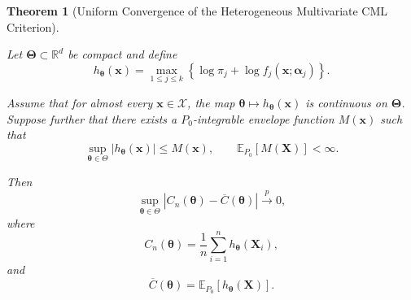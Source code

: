 \documentclass[pdflatex,sn-mathphys-ay]{sn-jnl}%
\let\oldtheta\theta
\renewcommand{\theta}{\boldsymbol{\oldtheta}}
\let\oldalpha\alpha
\renewcommand{\alpha}{\boldsymbol{\oldalpha}}
\theoremstyle{thmstyleone}%
\newtheorem{theorem}{Theorem}%
\theoremstyle{thmstyletwo}%
\theoremstyle{thmstylethree}%
\begin{document}
\begin{theorem}[Uniform Convergence of the Heterogeneous Multivariate CML Criterion]
\label{thm:uniform_convergence}

Let $\boldsymbol{\Theta} \subset \mathbb{R}^d$ be compact and define
\[
    h_{\boldsymbol{\theta}}(\mathbf{x})
    =
    \max_{1\leq j\leq k}
    \left\{
        \log \pi_j
        +
        \log f_j(\mathbf{x};\boldsymbol{\alpha}_j)
    \right\}.
\]

Assume that for almost every $\mathbf{x}\in\mathcal{X}$, the map
$ \boldsymbol{\theta}
    \mapsto
    h_{\boldsymbol{\theta}}(\mathbf{x})$ is continuous on $\boldsymbol{\Theta}$. Suppose further that there exists a
$P_0$-integrable envelope function $ M(\mathbf{x})$ such that
\[
    \sup_{\boldsymbol{\theta}\in\Theta}
    |h_{\boldsymbol{\theta}}(\mathbf{x})|
    \leq
    M(\mathbf{x}),
    \qquad
    \mathbb{E}_{P_0}
    \left[
        M(\mathbf{X})
    \right]
    <
    \infty.
\]

Then
\[
    \sup_{\boldsymbol{\theta}\in\Theta}
    \left|
        C_n(\boldsymbol{\theta})
        -
        \overline{C}(\boldsymbol{\theta})
    \right|
    \xrightarrow{p}
    0,
\]
where
\[
    C_n(\boldsymbol{\theta})
    =
    \frac{1}{n}
    \sum_{i=1}^n
    h_{\boldsymbol{\theta}}(\mathbf{X}_i),
\]
and
\[
    \overline{C}(\boldsymbol{\theta})
    =
    \mathbb{E}_{P_0}
    \left[
        h_{\boldsymbol{\theta}}(\mathbf{X})
    \right].
\]

\end{theorem}
\end{document}
